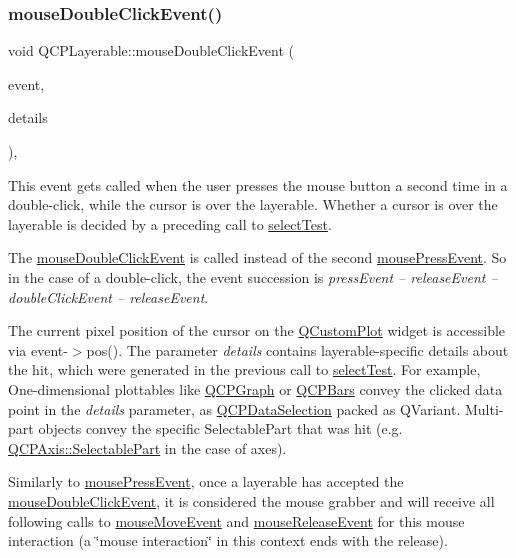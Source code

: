 \subsubsection{\texorpdfstring{mouse\+Double\+Click\+Event()}{mouseDoubleClickEvent()}}
{\footnotesize\ttfamily void Q\+C\+P\+Layerable\+::mouse\+Double\+Click\+Event (\begin{DoxyParamCaption}\item[{Q\+Mouse\+Event $\ast$}]{event,  }\item[{const Q\+Variant \&}]{details }\end{DoxyParamCaption})\hspace{0.3cm}{\ttfamily [protected]}, {\ttfamily [virtual]}}

This event gets called when the user presses the mouse button a second time in a double-\/click, while the cursor is over the layerable. Whether a cursor is over the layerable is decided by a preceding call to \hyperlink{class_q_c_p_layerable_a04db8351fefd44cfdb77958e75c6288e}{select\+Test}.

The \hyperlink{class_q_c_p_layerable_a4171e2e823aca242dd0279f00ed2de81}{mouse\+Double\+Click\+Event} is called instead of the second \hyperlink{class_q_c_p_layerable_af6567604818db90f4fd52822f8bc8376}{mouse\+Press\+Event}. So in the case of a double-\/click, the event succession is {\itshape press\+Event -- release\+Event -- double\+Click\+Event -- release\+Event}.

The current pixel position of the cursor on the \hyperlink{class_q_custom_plot}{Q\+Custom\+Plot} widget is accessible via {\ttfamily event-\/$>$pos()}. The parameter {\itshape details} contains layerable-\/specific details about the hit, which were generated in the previous call to \hyperlink{class_q_c_p_layerable_a04db8351fefd44cfdb77958e75c6288e}{select\+Test}. For example, One-\/dimensional plottables like \hyperlink{class_q_c_p_graph}{Q\+C\+P\+Graph} or \hyperlink{class_q_c_p_bars}{Q\+C\+P\+Bars} convey the clicked data point in the {\itshape details} parameter, as \hyperlink{class_q_c_p_data_selection}{Q\+C\+P\+Data\+Selection} packed as Q\+Variant. Multi-\/part objects convey the specific {\ttfamily Selectable\+Part} that was hit (e.\+g. \hyperlink{class_q_c_p_axis_abee4c7a54c468b1385dfce2c898b115f}{Q\+C\+P\+Axis\+::\+Selectable\+Part} in the case of axes).

Similarly to \hyperlink{class_q_c_p_layerable_af6567604818db90f4fd52822f8bc8376}{mouse\+Press\+Event}, once a layerable has accepted the \hyperlink{class_q_c_p_layerable_a4171e2e823aca242dd0279f00ed2de81}{mouse\+Double\+Click\+Event}, it is considered the mouse grabber and will receive all following calls to \hyperlink{class_q_c_p_layerable_a9eee1ba47fd69be111059ca3881933e4}{mouse\+Move\+Event} and \hyperlink{class_q_c_p_layerable_aa0d79b005686f668622bbe66ac03ba2c}{mouse\+Release\+Event} for this mouse interaction (a \char`\"{}mouse interaction\char`\"{} in this context ends with the release).

